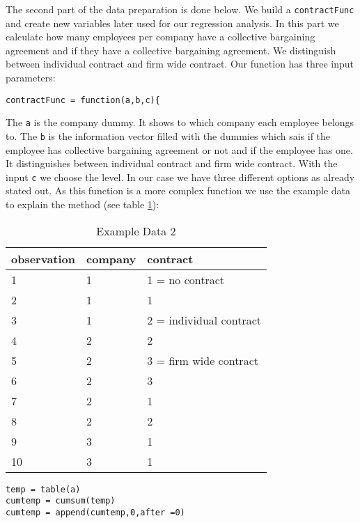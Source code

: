 The second part of the data preparation is done below. We build a \texttt{contractFunc} and create new variables later used for our regression analysis. In this part we calculate how many employees per company have a collective bargaining agreement and if they have a collective bargaining agreement. We distinguish between individual contract and firm wide contract. Our function has three input parameters:
\lstset{firstnumber = 91}
\begin{lstlisting}
contractFunc = function(a,b,c){   
\end{lstlisting}
The \texttt{a} is the company dummy. It shows to which company each employee belongs to. The \texttt{b} is the information vector filled with the dummies which sais if the employee has collective bargaining agreement or not and if the employee has one. It distinguishes between individual contract and firm wide contract. With the input \texttt{c}  we choose the level. In our case we have three different options as already stated out. As this function is a more complex function we use the example data to explain the method (see table \ref{ex2}):
\newline
\begin{table}[h!]
\centering
\caption{Example Data 2}
\label{ex2}
\begin{tabular}{|l|l|l|}
\hline
observation & company & contract \\ \hline
1           & 1       & 1 = no contract        \\ \hline
2           & 1       & 1        \\ \hline
3           & 1       & 2 = individual contract       \\ \hline
4           & 2       & 2        \\ \hline
5           & 2       & 3 = firm wide contract       \\ \hline
6           & 2       & 3        \\ \hline
7           & 2       & 1        \\ \hline
8           & 2       & 2        \\ \hline
9           & 3       & 1        \\ \hline
10          & 3       & 1        \\ \hline
\end{tabular}
\end{table}
\newline
\lstset{firstnumber = 96}
\begin{lstlisting}
temp = table(a)
cumtemp = cumsum(temp)                   
cumtemp = append(cumtemp,0,after =0)    
\end{lstlisting}
